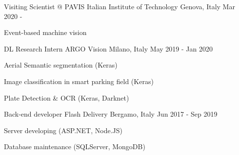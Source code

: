 

\begin{cventries}

\cventry
{Visiting Scientist @ PAVIS} %
{Italian Institute of Technology} %
{Genova, Italy} %
{Mar 2020 - } %
{
	\begin{cvitems} %
		\item Event-based machine vision
	\end{cvitems}
}

  \cventry
    {DL Research Intern} %
    {ARGO Vision} %
    {Milano, Italy} %
    {May 2019 - Jan 2020} %
    {
      \begin{cvitems} %
      \item Aerial Semantic segmentation (Keras)
	  \item Image classification in smart parking field  (Keras)
	  \item Plate Detection \& OCR  (Keras, Darknet)
      \end{cvitems}
    }

  \cventry
    {Back-end developer} %
    {Flash Delivery} %
    {Bergamo, Italy} %
    {Jun 2017 - Sep 2019} %
    {
      \begin{cvitems} %
	    \item Server developing (ASP.NET, Node.JS)
		\item Database maintenance (SQLServer, MongoDB)
      \end{cvitems}
    }


\end{cventries}
